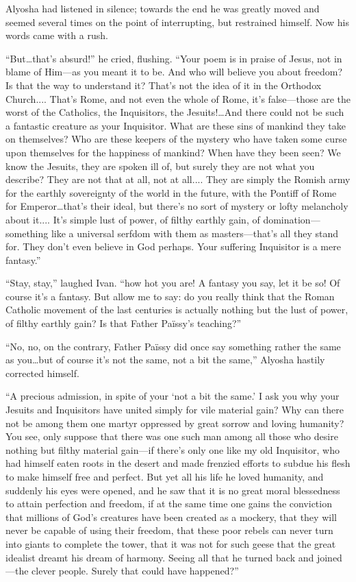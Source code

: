 Alyosha had listened in silence; towards the end he was greatly moved
and \llb seemed several times on the point of interrupting, but
restrained himself. Now his words came with a rush.

``But\ldots that's absurd!'' he cried, flushing. ``Your poem is in
praise of Jesus, not in blame of Him---as you meant it  to
be. And who will believe you about freedom? Is that the way to
understand it? That's not the idea of it in the Orthodox Church....
That's Rome, and not even the whole of Rome, it's false---those are
the worst of the Catholics, the Inquisitors, the Jesuits!\ldots And
there could not be such a fantastic creature as your Inquisitor. What
are these sins of mankind they take on themselves? Who are these
keepers of the mystery who have taken some curse upon themselves for
the happiness of mankind? When have they been seen? We know the
Jesuits, they are spoken ill of, but surely they are not what you
describe? They are not that at all, not at all.... They are simply the
Romish army for the earthly sovereignty of the world in the future,
with the Pontiff of Rome for Emperor\ldots that's their ideal, but
there's no sort of mystery or lofty melancholy about it.... It's
simple lust of power, of filthy earthly gain, of
dom\-i\-na\-tion---some\-thing like a universal serfdom with them as
mas\-ters---that's all they stand for. They don't even believe in God
perhaps. Your suffering Inquisitor is a mere fantasy.''

``Stay, stay,'' laughed Ivan. ``how hot you are! A fantasy you say,
let it be so! Of course it's a fantasy. But allow me to say: do you
really think that the Roman Catholic movement of the last centuries is
actually nothing but the lust of power, of filthy earthly gain? Is
that Father Pa\"{i}ssy's teaching?''

``No, no, on the contrary, Father Pa\"{i}ssy did once say something
rather the same as you\ldots but of course it's not the same, not a
bit the same,'' Alyosha hastily corrected himself.

``A precious admission, in spite of your `not a bit the same.' I ask
you why your Jesuits and Inquisitors have united simply for vile
material gain? Why can there not be among them one martyr oppressed by
great sorrow and loving humanity? You see, only suppose that there was
one such man among all those who desire nothing but filthy material
gain---if there's only one like my old Inquisitor, who had himself
eaten roots in the desert and made frenzied efforts to subdue his
flesh to make himself free and perfect. But yet all his life he loved
humanity, and suddenly his eyes were opened, and he saw that it is no
great moral blessedness to attain perfection and freedom, if at the
same time one gains the conviction that millions of God's creatures
have been created as a mockery, that they will never be capable of
using their freedom, that these poor rebels can never turn into giants
to complete the tower, that it was not for such geese that the great
idealist dreamt his dream of harmony. Seeing  all that he
turned back and joined---the clever people. Surely that could have
happened?''

